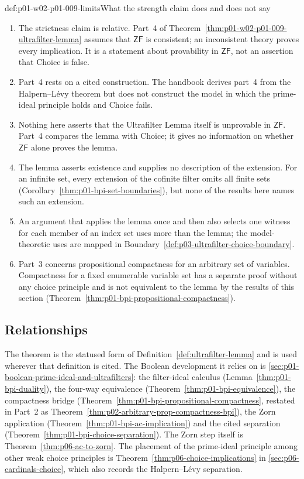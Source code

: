 \begin{hbwarning}{def:p01-w02-p01-009-limits}{What the strength claim does and does not say}
\begin{enumerate}
  \item The strictness claim is relative. Part~4 of
    Theorem~\ref{thm:p01-w02-p01-009-ultrafilter-lemma} assumes that
    \(\mathsf{ZF}\) is consistent; an inconsistent theory proves every
    implication. It is a statement about provability in \(\mathsf{ZF}\), not
    an assertion that Choice is false.
  \item Part~4 rests on a cited construction. The handbook derives part~4 from
    the Halpern--L\'evy theorem \cite{HalpernLevy1971} but does not construct
    the model in which the prime-ideal principle holds and Choice fails.
  \item Nothing here asserts that the Ultrafilter Lemma itself is unprovable
    in \(\mathsf{ZF}\). Part~4 compares the lemma with Choice; it gives no
    information on whether \(\mathsf{ZF}\) alone proves the lemma.
  \item The lemma asserts existence and supplies no description of the
    extension. For an infinite set, every extension of the cofinite filter
    omits all finite sets (Corollary~\ref{thm:p01-bpi-set-boundaries}), but
    none of the results here names such an extension.
  \item An argument that applies the lemma once and then also selects one
    witness for each member of an index set uses more than the lemma; the
    model-theoretic uses are mapped in
    Boundary~\ref{def:p03-ultrafilter-choice-boundary}.
  \item Part~3 concerns propositional compactness for an arbitrary set of
    variables. Compactness for a fixed enumerable variable set has a separate
    proof without any choice principle and is not equivalent to the lemma by
    the results of this section
    (Theorem~\ref{thm:p01-bpi-propositional-compactness}).
\end{enumerate}
\end{hbwarning}

\subsection{Relationships}
\label{sec:p01-w02-p01-009-relationships}

The theorem is the statused form of Definition~\ref{def:ultrafilter-lemma}
and is used wherever that definition is cited. The Boolean development it
relies on is \cref{sec:p01-boolean-prime-ideal-and-ultrafilters}: the
filter-ideal calculus (Lemma~\ref{thm:p01-bpi-duality}), the four-way
equivalence (Theorem~\ref{thm:p01-bpi-equivalence}), the compactness bridge
(Theorem~\ref{thm:p01-bpi-propositional-compactness}, restated in Part~2 as
Theorem~\ref{thm:p02-arbitrary-prop-compactness-bpi}), the Zorn application
(Theorem~\ref{thm:p01-bpi-ac-implication}) and the cited separation
(Theorem~\ref{thm:p01-bpi-choice-separation}). The Zorn step itself is
Theorem~\ref{thm:p06-ac-to-zorn}. The placement of the prime-ideal principle
among other weak choice principles is Theorem~\ref{thm:p06-choice-implications}
in \cref{sec:p06-cardinals-choice}, which also records the Halpern--L\'evy
separation.


